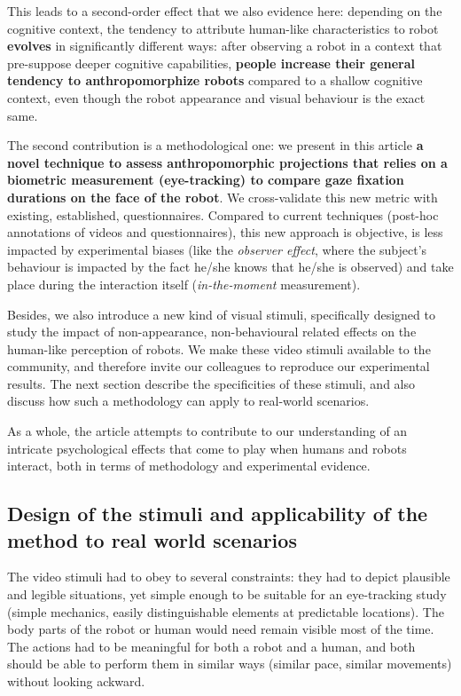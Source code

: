 \documentclass[lettersize, noapacite, twoside, HRI]{apa_HRI}
\begin{document}
This leads to a second-order effect that we also evidence here: depending on the
cognitive context, the tendency to attribute human-like characteristics to robot
\textbf{evolves} in significantly different ways: after observing a robot in a
context that pre-suppose deeper cognitive capabilities, \textbf{people increase
their general tendency to anthropomorphize robots} compared to a shallow
cognitive context, even though the robot appearance and visual behaviour is the
exact same.

The second contribution is a methodological one: we present in this article
\textbf{a novel technique to assess anthropomorphic projections that relies on a
biometric measurement (eye-tracking) to compare gaze fixation durations on
the face of the robot}. We cross-validate this new metric with existing,
established, questionnaires. Compared to current techniques (post-hoc
annotations of videos and questionnaires), this new approach is objective,
is less impacted by experimental biases (like the \emph{observer effect},
where the subject's behaviour is impacted by the fact he/she knows that
he/she is observed) and take place during the interaction itself
(\emph{in-the-moment} measurement).

Besides, we also introduce a new kind of visual stimuli, specifically designed
to study the impact of non-appearance, non-behavioural related effects on the
human-like perception of robots. We make these video stimuli available to the
community, and therefore invite our colleagues to reproduce our experimental
results. The next section describe the specificities of these stimuli, and also
discuss how such a methodology can apply to real-world scenarios.

As a whole, the article attempts to contribute to our understanding of an
intricate psychological effects that come to play when humans and robots
interact, both in terms of methodology and experimental evidence.

\subsection{Design of the stimuli and applicability of the method to real world
scenarios}
\label{stimuli_design}

The video stimuli had to obey to several constraints: they had to depict
plausible and legible situations, yet simple enough to be suitable for an
eye-tracking study (simple mechanics, easily distinguishable elements at
predictable locations). The body parts of the robot or human would need remain
visible most of the time. The actions had to be meaningful for both a robot and
a human, and both should be able to perform them in similar ways (similar pace,
similar movements) without looking ackward.
\end{document}
